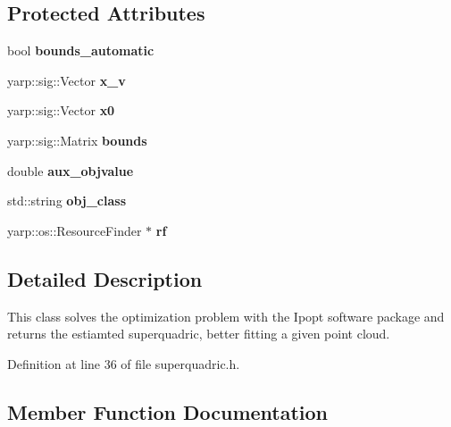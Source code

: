 \subsection*{Protected Attributes}
\begin{DoxyCompactItemize}
\item 
bool {\bfseries bounds\-\_\-automatic}\label{classSuperQuadric__NLP_ac4ae54a0a2bc47b2a984278a4e57400c}

\item 
yarp\-::sig\-::\-Vector {\bfseries x\-\_\-v}\label{classSuperQuadric__NLP_a4215586669b4e4e835993634290cac9a}

\item 
yarp\-::sig\-::\-Vector {\bfseries x0}\label{classSuperQuadric__NLP_a25e5121f404d68a8fa0122e803945f8b}

\item 
yarp\-::sig\-::\-Matrix {\bfseries bounds}\label{classSuperQuadric__NLP_a3300e78dabc6dc8fd7e959c176b8a32c}

\item 
double {\bfseries aux\-\_\-objvalue}\label{classSuperQuadric__NLP_ad0bf24004b855864ad0a498f9fb13c81}

\item 
std\-::string {\bfseries obj\-\_\-class}\label{classSuperQuadric__NLP_a6806ddd4f4b035abbf7835e4b38931ca}

\item 
yarp\-::os\-::\-Resource\-Finder $\ast$ {\bfseries rf}\label{classSuperQuadric__NLP_a7dc22430259697726ab6341fc2e95074}

\end{DoxyCompactItemize}


\subsection{Detailed Description}
This class solves the optimization problem with the Ipopt software package and returns the estiamted superquadric, better fitting a given point cloud. 

Definition at line 36 of file superquadric.\-h.



\subsection{Member Function Documentation}
